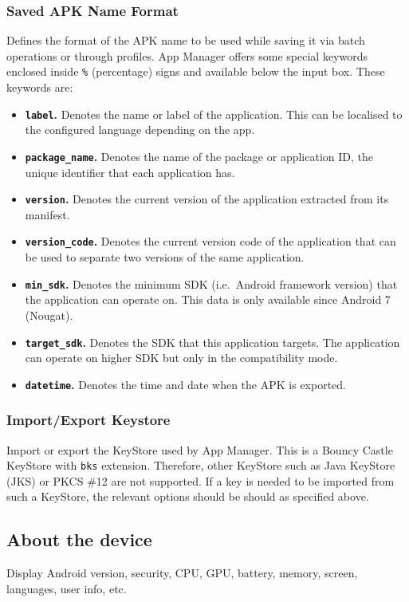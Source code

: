\subsubsection{Saved APK Name Format}\label{subsubsec:saved-apk-name-format} %
Defines the format of the APK name to be used while saving it via batch operations or through profiles.
App Manager offers some special keywords enclosed inside \texttt{\%} (percentage) signs and available below the input box.
These keywords are:
\begin{itemize}
    \item \textbf{\texttt{label}.} Denotes the name or label of the application. This can be localised to the configured language depending on the app.
    \item \textbf{\texttt{package\_name}.} Denotes the name of the package or application ID, the unique identifier that each application has.
    \item \textbf{\texttt{version}.} Denotes the current version of the application extracted from its manifest.
    \item \textbf{\texttt{version\_code}.} Denotes the current version code of the application that can be used to separate two versions of the same application.
    \item \textbf{\texttt{min\_sdk}.} Denotes the minimum SDK (i.e.\ Android framework version) that the application can operate on. This data is only available since Android 7 (Nougat).
    \item \textbf{\texttt{target\_sdk}.} Denotes the SDK that this application targets. The application can operate on higher SDK but only in the compatibility mode.
    \item \textbf{\texttt{datetime}.} Denotes the time and date when the APK is exported.
\end{itemize}

\subsubsection{Import/Export Keystore}\label{subsubsec:import/export-keystore} %
Import or export the KeyStore used by App Manager. This is a Bouncy Castle KeyStore with \texttt{bks} extension.
Therefore, other KeyStore such as Java KeyStore (JKS) or PKCS \#12 are not supported.
If a key is needed to be imported from such a KeyStore, the relevant options should be should as specified above.


\subsection{About the device}\label{subsec:device-info} %
Display Android version, security, CPU, GPU, battery, memory, screen, languages, user info, etc.
